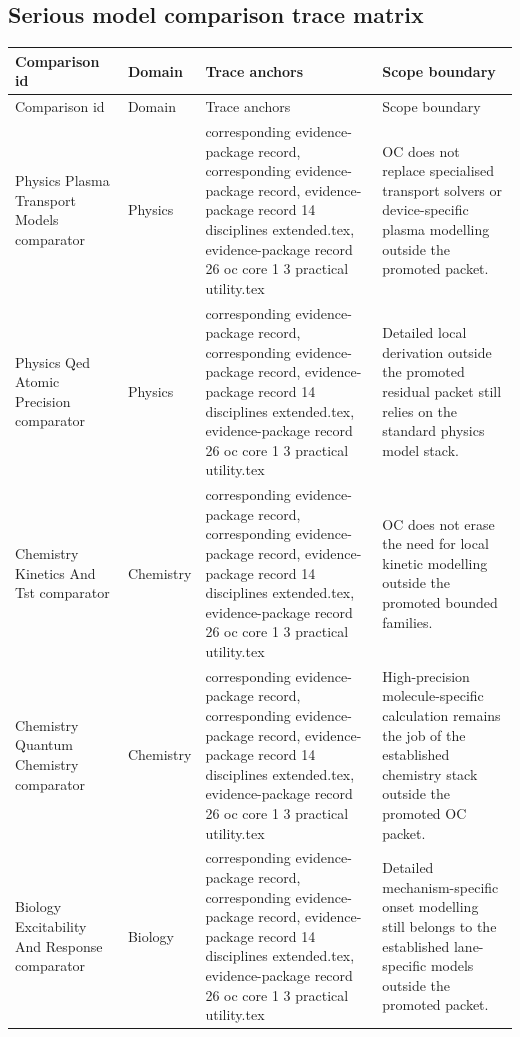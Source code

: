 \subsection{Serious model comparison trace matrix}
\begin{longtable}{@{}L{0.20\textwidth}L{0.11\textwidth}L{0.33\textwidth}L{0.28\textwidth}@{}}
\toprule
Comparison id & Domain & Trace anchors & Scope boundary \\
\midrule
\endfirsthead
\toprule
Comparison id & Domain & Trace anchors & Scope boundary \\
\midrule
\endhead
Physics Plasma Transport Models comparator & Physics & corresponding evidence-package record, corresponding evidence-package record, \allowbreak evidence-package record 14 disciplines extended.tex, \allowbreak evidence-package record 26 oc core 1 3 practical utility.tex & OC does not replace specialised transport solvers or device-specific plasma modelling outside the promoted packet. \\
Physics Qed Atomic Precision comparator & Physics & corresponding evidence-package record, corresponding evidence-package record, \allowbreak evidence-package record 14 disciplines extended.tex, \allowbreak evidence-package record 26 oc core 1 3 practical utility.tex & Detailed local derivation outside the promoted residual packet still relies on the standard physics model stack. \\
Chemistry Kinetics And Tst comparator & Chemistry & corresponding evidence-package record, corresponding evidence-package record, \allowbreak evidence-package record 14 disciplines extended.tex, \allowbreak evidence-package record 26 oc core 1 3 practical utility.tex & OC does not erase the need for local kinetic modelling outside the promoted bounded families. \\
Chemistry Quantum Chemistry comparator & Chemistry & corresponding evidence-package record, corresponding evidence-package record, \allowbreak evidence-package record 14 disciplines extended.tex, \allowbreak evidence-package record 26 oc core 1 3 practical utility.tex & High-precision molecule-specific calculation remains the job of the established chemistry stack outside the promoted OC packet. \\
Biology Excitability And Response comparator & Biology & corresponding evidence-package record, corresponding evidence-package record, \allowbreak evidence-package record 14 disciplines extended.tex, \allowbreak evidence-package record 26 oc core 1 3 practical utility.tex & Detailed mechanism-specific onset modelling still belongs to the established lane-specific models outside the promoted packet. \\

\end{longtable}
